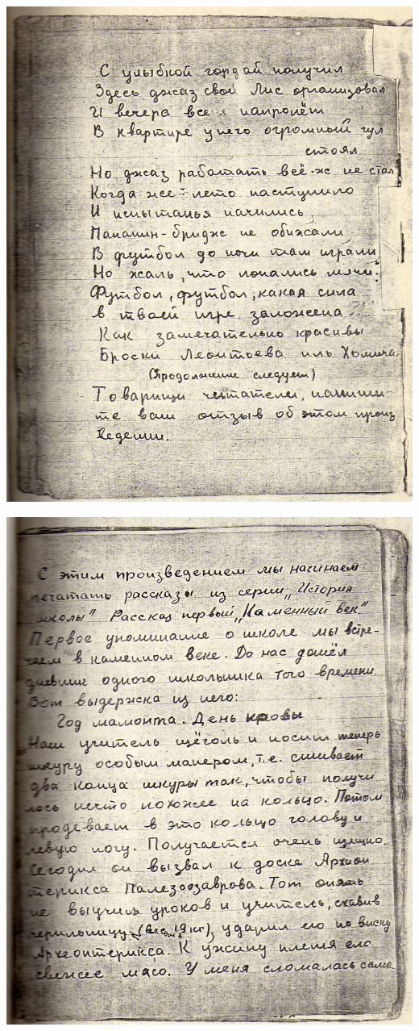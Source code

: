 \noindent
\includegraphics[width=\textwidth]{inc/Vynd/Vynd007}

\noindent
\includegraphics[width=\textwidth]{inc/Vynd/Vynd008}

